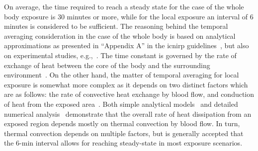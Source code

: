 On average, the time required to reach a steady state for the case of the whole body exposure is 30 minutes or more, while for the local exposure an interval of 6 minutes is considered to be sufficient.
The reasoning behind the temporal averaging consideration in the case of the whole body is based on analytical approximations as presented in ``Appendix A'' in the \gls{icnirp} guidelines~\cite{ICNIRP2020Guidelines}, but also on experimental studies, e.g.,~\cite{Hirata2008FDTD,Nelson2013High}.
The time constant is governed by the rate of exchange of heat between the core of the body and the surrounding environment~\cite{Adair2003Thermoregulatory}.
On the other hand, the matter of temporal averaging for local exposure is somewhat more complex as it depends on two distinct factors which are as follows: the rate of convective heat exchange by blood flow, and conduction of heat from the exposed area~\cite{Foster2017Thermal}.
Both simple analytical models~\cite{Foster2017Thermal} and detailed numerical analysis~\cite{Morimoto2017Time} demonstrate that the overall rate of heat dissipation from an exposed region depends mostly on thermal convection by blood flow.
In turn, thermal convection depends on multiple factors, but is generally accepted that the 6-min interval allows for reaching steady-state in most exposure scenarios.

